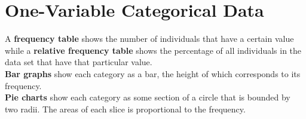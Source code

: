 \documentclass[../AP_Statistics.tex]{subfiles}
\begin{document}
	\chapter{One-Variable Categorical Data}
		A \textbf{frequency table} shows the number of individuals that have a certain value while a \textbf{relative frequency table} shows the percentage of all individuals in the data set that have that particular value. \\
		\textbf{Bar graphs} show each category as a bar, the height of which corresponds to its frequency. \\
		\textbf{Pie charts} show each category as some section of a circle that is bounded by two radii. The areas of each slice is proportional to the frequency. 
\end{document}
